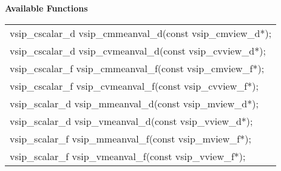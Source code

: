 \cvsiplh
\newline \hspace*{.8cm} \vspace*{.1cm} \textbf{Available Functions }
\newline \hspace*{1.1cm} {
\ttfamily
\begin{tabular}[H]{l}
vsip\_cscalar\_d vsip\_cmmeanval\_d(const vsip\_cmview\_d*);\\
vsip\_cscalar\_d vsip\_cvmeanval\_d(const vsip\_cvview\_d*);\\
vsip\_cscalar\_f vsip\_cmmeanval\_f(const vsip\_cmview\_f*);\\
vsip\_cscalar\_f vsip\_cvmeanval\_f(const vsip\_cvview\_f*);\\
vsip\_scalar\_d vsip\_mmeanval\_d(const vsip\_mview\_d*);\\
vsip\_scalar\_d vsip\_vmeanval\_d(const vsip\_vview\_d*);\\
vsip\_scalar\_f vsip\_mmeanval\_f(const vsip\_mview\_f*);\\
vsip\_scalar\_f vsip\_vmeanval\_f(const vsip\_vview\_f*);\\
\end{tabular}
}
\pyjvsiph
{}
